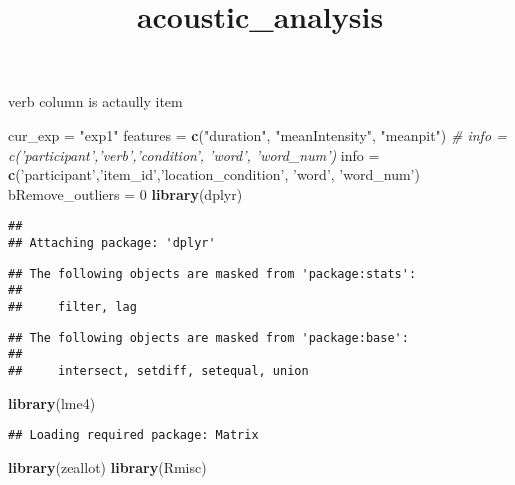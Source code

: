 \documentclass[]{article}
\title{acoustic\_analysis}
\author{}
\date{}
\newenvironment{Shaded}{\begin{snugshade}}{\end{snugshade}}
\newcommand{\CommentTok}[1]{\textcolor[rgb]{0.56,0.35,0.01}{\textit{#1}}}
\newcommand{\DecValTok}[1]{\textcolor[rgb]{0.00,0.00,0.81}{#1}}
\newcommand{\KeywordTok}[1]{\textcolor[rgb]{0.13,0.29,0.53}{\textbf{#1}}}
\newcommand{\NormalTok}[1]{#1}
\newcommand{\StringTok}[1]{\textcolor[rgb]{0.31,0.60,0.02}{#1}}
\begin{document}
\maketitle

verb column is actaully item

\begin{Shaded}
\begin{Highlighting}[]
\NormalTok{cur_exp =}\StringTok{ "exp1"}
\NormalTok{features =}\StringTok{ }\KeywordTok{c}\NormalTok{(}\StringTok{"duration"}\NormalTok{, }\StringTok{"meanIntensity"}\NormalTok{, }\StringTok{"meanpit"}\NormalTok{)}
\CommentTok{# info = c('participant','verb','condition', 'word', 'word_num')}
\NormalTok{info =}\StringTok{ }\KeywordTok{c}\NormalTok{(}\StringTok{'participant'}\NormalTok{,}\StringTok{'item_id'}\NormalTok{,}\StringTok{'location_condition'}\NormalTok{, }\StringTok{'word'}\NormalTok{, }\StringTok{'word_num'}\NormalTok{)}
\NormalTok{bRemove_outliers =}\StringTok{ }\DecValTok{0}
\KeywordTok{library}\NormalTok{(dplyr)}
\end{Highlighting}
\end{Shaded}

\begin{verbatim}
## 
## Attaching package: 'dplyr'
\end{verbatim}

\begin{verbatim}
## The following objects are masked from 'package:stats':
## 
##     filter, lag
\end{verbatim}

\begin{verbatim}
## The following objects are masked from 'package:base':
## 
##     intersect, setdiff, setequal, union
\end{verbatim}

\begin{Shaded}
\begin{Highlighting}[]
\KeywordTok{library}\NormalTok{(lme4)}
\end{Highlighting}
\end{Shaded}

\begin{verbatim}
## Loading required package: Matrix
\end{verbatim}

\begin{Shaded}
\begin{Highlighting}[]
\KeywordTok{library}\NormalTok{(zeallot)}
  \KeywordTok{library}\NormalTok{(Rmisc)}
\end{Highlighting}
\end{Shaded}
\end{document}
